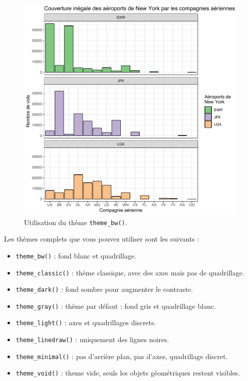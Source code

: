\documentclass[a4paperpaper,]{article}
\providecommand{\tightlist}{%
  \setlength{\itemsep}{0pt}\setlength{\parskip}{0pt}}
\begin{document}
\begin{figure}[htpb]

{\centering \includegraphics[width=0.9\linewidth]{figure/themebw-1} 

}

\caption{Utilisation du thème \texttt{theme\_bw()}.}\label{fig:themebw}
\end{figure}



Les thèmes complets que vous pouvez utiliser sont les suivants :

\begin{itemize}
\tightlist
\item
  \texttt{theme\_bw()} : fond blanc et quadrillage.
\item
  \texttt{theme\_classic()} : thème classique, avec des axes mais pas de quadrillage.
\item
  \texttt{theme\_dark()} : fond sombre pour augmenter le contraste.
\item
  \texttt{theme\_gray()} : thème par défaut : fond gris et quadrillage blanc.
\item
  \texttt{theme\_light()} : axes et quadrillages discrets.
\item
  \texttt{theme\_linedraw()} : uniquement des lignes noires.
\item
  \texttt{theme\_minimal()} : pas d'arrière plan, pas d'axes, quadrillage discret.
\item
  \texttt{theme\_void()} : theme vide, seuls les objets géométriques restent visibles.
\end{itemize}
\end{document}
